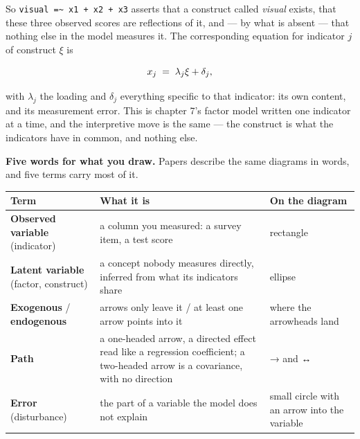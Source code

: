 \documentclass[
  letterpaper,
  10pt,
  twoside,
  openright,
  numbers=noenddot,
  chapterprefix=true]{scrbook}
\begin{document}
So \texttt{visual\ =\textasciitilde{}\ x1\ +\ x2\ +\ x3} asserts that a
construct called \emph{visual} exists, that these three observed scores
are reflections of it, and --- by what is absent --- that nothing else
in the model measures it. The corresponding equation for indicator \(j\)
of construct \(\xi\) is

\[
x_j \thickspace=\thickspace \lambda_j \xi + \delta_j ,
\]

with \(\lambda_j\) the loading and \(\delta_j\) everything specific to
that indicator: its own content, and its measurement error. This is
chapter 7's factor model written one indicator at a time, and the
interpretive move is the same --- the construct is what the indicators
have in common, and nothing else.

\textbf{Five words for what you draw.} Papers describe the same diagrams
in words, and five terms carry most of it.

\begin{longtable}[]{@{}
  >{\raggedright\arraybackslash}p{}
  >{\raggedright\arraybackslash}p{}
  >{\raggedright\arraybackslash}p{}@{}}
\toprule\noalign{}
\begin{minipage}[b]{\linewidth}\raggedright
Term
\end{minipage} & \begin{minipage}[b]{\linewidth}\raggedright
What it is
\end{minipage} & \begin{minipage}[b]{\linewidth}\raggedright
On the diagram
\end{minipage} \\
\midrule\noalign{}
\endhead
\bottomrule\noalign{}
\endlastfoot
\textbf{Observed variable} (indicator) & a column you measured: a survey
item, a test score & rectangle \\
\textbf{Latent variable} (factor, construct) & a concept nobody measures
directly, inferred from what its indicators share & ellipse \\
\textbf{Exogenous} / \textbf{endogenous} & arrows only leave it / at
least one arrow points into it & where the arrowheads land \\
\textbf{Path} & a one-headed arrow, a directed effect read like a
regression coefficient; a two-headed arrow is a covariance, with no
direction & → and ↔ \\
\textbf{Error} (disturbance) & the part of a variable the model does not
explain & small circle with an arrow into the variable \\
\end{longtable}
\end{document}
